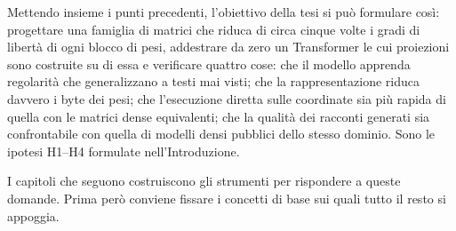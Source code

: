 Mettendo insieme i punti precedenti, l'obiettivo della tesi si può formulare così: progettare una famiglia di matrici che riduca di circa cinque volte i gradi di libertà di ogni blocco di pesi, addestrare da zero un Transformer le cui proiezioni sono costruite su di essa e verificare quattro cose: che il modello apprenda regolarità che generalizzano a testi mai visti; che la rappresentazione riduca davvero i byte dei pesi; che l'esecuzione diretta sulle coordinate sia più rapida di quella con le matrici dense equivalenti; che la qualità dei racconti generati sia confrontabile con quella di modelli densi pubblici dello stesso dominio. Sono le ipotesi H1--H4 formulate nell'Introduzione.

I capitoli che seguono costruiscono gli strumenti per rispondere a queste domande. Prima però conviene fissare i concetti di base sui quali tutto il resto si appoggia.
